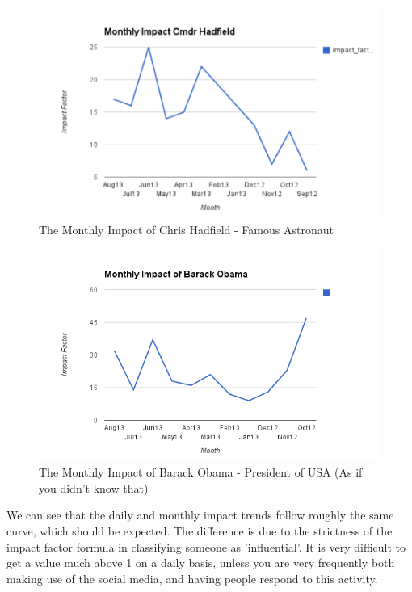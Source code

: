 \begin{figure}[h!]
\centering
\includegraphics{Images/monthly_impact_chris_hadfield.pdf}
\caption{The Monthly Impact of Chris Hadfield - Famous Astronaut}
\end{figure}

\begin{figure}[h!]
\centering
\includegraphics{Images/monthly_impact_barack_obama.png}
\caption{The Monthly Impact of Barack Obama - President of USA (As if you didn't know that)}
\end{figure}

We can see that the daily and monthly impact trends follow roughly the same curve, which should be expected. The difference is due to the strictness of the impact factor formula in classifying someone as 'influential'. It is very difficult to get a value much above 1 on a daily basis, unless you are very frequently both making use of the social media, and having people respond to this activity. 

